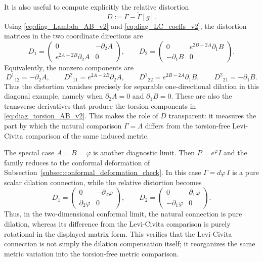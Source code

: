 \documentclass[12pt]{amsart}
\theoremstyle{definition}
\theoremstyle{remark}
\begin{document}
It is also useful to compute explicitly the relative distortion
\begin{equation}\label{eq:diag_distortion_definition_v2}
 D:=\Gamma-\mathring\Gamma[g].
\end{equation}
Using \eqref{eq:diag_Lambda_AB_v2} and \eqref{eq:diag_LC_coeffs_v2}, the distortion matrices in the two coordinate directions are
\begin{equation}\label{eq:diag_distortion_matrices_v2}
 D_1=
 \begin{pmatrix}
 0&-\partial_2A\\[2pt]
 e^{2A-2B}\partial_2A&0
 \end{pmatrix},
 \qquad
 D_2=
 \begin{pmatrix}
 0&e^{2B-2A}\partial_1B\\[2pt]
 -\partial_1B&0
 \end{pmatrix}.
\end{equation}
Equivalently, the nonzero components are
\begin{equation}\label{eq:diag_distortion_components_v2}
 D^1{}_{12}=-\partial_2A,\qquad
 D^2{}_{11}=e^{2A-2B}\partial_2A,\qquad
 D^1{}_{22}=e^{2B-2A}\partial_1B,\qquad
 D^2{}_{21}=-\partial_1B .
\end{equation}
Thus the distortion vanishes precisely for separable one-directional dilation in this diagonal example, namely when \(\partial_2A=0\) and \(\partial_1B=0\).  These are also the transverse derivatives that produce the torsion components in \eqref{eq:diag_torsion_AB_v2}.  This makes the role of \(D\) transparent: it measures the part by which the natural comparison \(\Gamma=\Lambda\) differs from the torsion-free Levi-Civita comparison of the same induced metric.

The special case \(A=B=\varphi\) is another diagnostic limit.  Then \(P=e^\varphi I\) and the family reduces to the conformal deformation of Subsection~\ref{subsec:conformal_deformation_check}.  In this case \(\Gamma=d\varphi\,I\) is a pure scalar dilation connection, while the relative distortion becomes
\begin{equation}\label{eq:diag_distortion_conformal_limit_v2}
 D_1=
 \begin{pmatrix}
 0&-\partial_2\varphi\\[2pt]
 \partial_2\varphi&0
 \end{pmatrix},
 \qquad
 D_2=
 \begin{pmatrix}
 0&\partial_1\varphi\\[2pt]
 -\partial_1\varphi&0
 \end{pmatrix}.
\end{equation}
Thus, in the two-dimensional conformal limit, the natural connection is pure dilation, whereas its difference from the Levi-Civita comparison is purely rotational in the displayed matrix form.  This verifies that the Levi-Civita connection is not simply the dilation compensation itself; it reorganizes the same metric variation into the torsion-free metric comparison.
\end{document}
